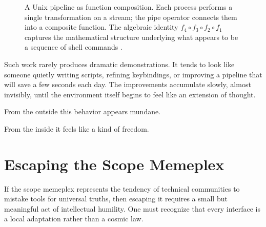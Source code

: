\documentclass[12pt]{article}
\theoremstyle{definition}
\begin{document}
\begin{figure}[h]
\centering
{}
\caption{A Unix pipeline as function composition. Each process performs a
single transformation on a stream; the pipe operator connects them into
a composite function. The algebraic identity $f_4 \circ f_3 \circ f_2
\circ f_1$ captures the mathematical structure underlying what appears
to be a sequence of shell commands \cite{mcilroy1978,ritchie1974}.}
\label{fig:pipeline}
\end{figure}

Such work rarely produces dramatic demonstrations. It tends to look like
someone quietly writing scripts, refining keybindings, or improving a
pipeline that will save a few seconds each day. The improvements
accumulate slowly, almost invisibly, until the environment itself begins
to feel like an extension of thought.

From the outside this behavior appears mundane.

From the inside it feels like a kind of freedom.

\section{Escaping the Scope Memeplex}

If the scope memeplex represents the tendency of technical communities to
mistake tools for universal truths, then escaping it requires a small
but meaningful act of intellectual humility. One must recognize that
every interface is a local adaptation rather than a cosmic law.
\end{document}
